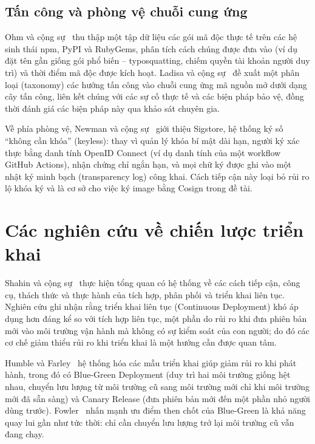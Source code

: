 \documentclass[12pt,a4paper,oneside]{extreport}
\begin{document}
\subsection{Tấn công và phòng vệ chuỗi cung ứng}
Ohm và cộng sự~\cite{ohm2020} thu thập một tập dữ liệu các gói mã độc thực tế
trên các hệ sinh thái npm, PyPI và RubyGems, phân tích cách chúng được đưa vào
(ví dụ đặt tên gần giống gói phổ biến -- typosquatting, chiếm quyền tài khoản
người duy trì) và thời điểm mã độc được kích hoạt. Ladisa và
cộng sự~\cite{ladisa2023} đề xuất một phân loại (taxonomy) các hướng tấn công
vào chuỗi cung ứng mã nguồn mở dưới dạng cây tấn công, liên kết chúng với các
sự cố thực tế và các biện pháp bảo vệ, đồng thời đánh giá các biện pháp này qua
khảo sát chuyên gia.

Về phía phòng vệ, Newman và cộng sự~\cite{sigstore-paper} giới thiệu Sigstore,
hệ thống ký số ``không cần khóa'' (keyless): thay vì quản lý khóa bí mật dài
hạn, người ký xác thực bằng danh tính OpenID Connect (ví dụ danh tính của một
workflow GitHub Actions), nhận chứng chỉ ngắn hạn, và mọi chữ ký được ghi vào
một nhật ký minh bạch (transparency log) công khai. Cách tiếp cận này loại bỏ
rủi ro lộ khóa ký và là cơ sở cho việc ký image bằng Cosign trong đề tài.

\section{Các nghiên cứu về chiến lược triển khai}
\label{sec:deploy-research}
Shahin và cộng sự~\cite{shahin2017} thực hiện tổng quan có hệ thống về các cách
tiếp cận, công cụ, thách thức và thực hành của tích hợp, phân phối và triển
khai liên tục. Nghiên cứu ghi nhận rằng triển khai liên tục (Continuous
Deployment) khó áp dụng hơn đáng kể so với tích hợp liên tục, một phần do rủi
ro khi đưa phiên bản mới vào môi trường vận hành mà không có sự kiểm soát của
con người; do đó các cơ chế giảm thiểu rủi ro khi triển khai là một hướng cần
được quan tâm.

Humble và Farley~\cite{humble2010} hệ thống hóa các mẫu triển khai giúp giảm
rủi ro khi phát hành, trong đó có Blue-Green Deployment (duy trì hai môi trường
giống hệt nhau, chuyển lưu lượng từ môi trường cũ sang môi trường mới chỉ khi
môi trường mới đã sẵn sàng) và Canary Release (đưa phiên bản mới đến một phần
nhỏ người dùng trước). Fowler~\cite{fowler-bluegreen} nhấn mạnh ưu điểm then
chốt của Blue-Green là khả năng quay lui gần như tức thời: chỉ cần chuyển lưu
lượng trở lại môi trường cũ vẫn đang chạy.
\end{document}
